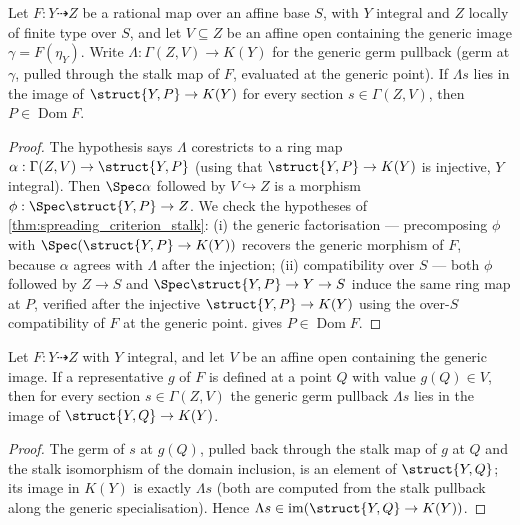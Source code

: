 \begin{theorem}
  \label{thm:germ_range_criterion}
  \leanok
  Let \(F : Y \dashrightarrow Z\) be a rational map over an affine base \(S\),
  with \(Y\) integral and \(Z\) locally of finite type over \(S\), and let
  \(V \subseteq Z\) be an affine open containing the generic image
  \(\gamma = F(\eta_Y)\). Write \(\Lambda : \Gamma(Z, V) \to K(Y)\) for the
  generic germ pullback (germ at \(\gamma\), pulled through the stalk map of
  \(F\), evaluated at the generic point). If \(\Lambda s\) lies in the image of
  \(\struct{Y,P} \to K(Y)\) for every section \(s \in \Gamma(Z, V)\), then
  \(P \in \operatorname{Dom} F\).
\end{theorem}
\begin{proof}
  \leanok
  The hypothesis says \(\Lambda\) corestricts to a ring map
  \(\alpha : \Gamma(Z, V) \to \struct{Y,P}\) (using that \(\struct{Y,P} \to
  K(Y)\) is injective, \(Y\) integral). Then \(\Spec\alpha\) followed by
  \(V \hookrightarrow Z\) is a morphism \(\phi : \Spec\struct{Y,P} \to Z\). We
  check the hypotheses of \ref{thm:spreading_criterion_stalk}: (i) the generic
  factorisation --- precomposing \(\phi\) with \(\Spec(\struct{Y,P} \to K(Y))\)
  recovers the generic morphism of \(F\), because \(\alpha\) agrees with
  \(\Lambda\) after the injection; (ii) compatibility over \(S\) --- both
  \(\phi\) followed by \(Z \to S\) and \(\Spec\struct{Y,P} \to Y \to S\) induce
  the same ring map at \(P\), verified after the injective \(\struct{Y,P} \to
  K(Y)\) using the over-\(S\) compatibility of \(F\) at the generic point.
   gives \(P \in \operatorname{Dom} F\).
\end{proof}

\begin{theorem}
  \label{thm:germ_range_of_domain}
  \leanok
  Let \(F : Y \dashrightarrow Z\) with \(Y\) integral, and let \(V\) be an affine
  open containing the generic image. If a representative \(g\) of \(F\) is defined
  at a point \(Q\) with value \(g(Q) \in V\), then for every section \(s \in
  \Gamma(Z, V)\) the generic germ pullback \(\Lambda s\) lies in the image of
  \(\struct{Y,Q} \to K(Y)\).
\end{theorem}
\begin{proof}
  \leanok
  The germ of \(s\) at \(g(Q)\), pulled back through the stalk map of \(g\) at
  \(Q\) and the stalk isomorphism of the domain inclusion, is an element of
  \(\struct{Y,Q}\); its image in \(K(Y)\) is exactly \(\Lambda s\) (both are
  computed from the stalk pullback along the generic specialisation). Hence
  \(\Lambda s \in \operatorname{im}(\struct{Y,Q} \to K(Y))\).
\end{proof}

